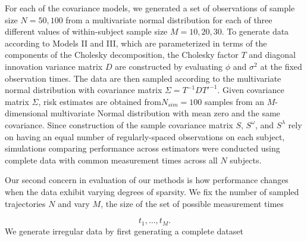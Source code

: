 %

For each of the covariance models, we generated a set of observations of sample size $N = 50, 100$ from a multivariate normal distribution for each of three different values of within-subject sample size $M = 10, 20, 30$. To generate data according to Models II and III, which are parameterized in terms of the components of the Cholesky decomposition, the Cholesky factor $T$ and diagonal innovation variance matrix $D$ are constructed by evaluating $\phi$ and $\sigma^2$ at the fixed observation times. The data are then sampled according to the multivariate normal distribution with covariance matrix $\Sigma = T^{-1} D {T'}^{-1}$. Given covariance matrix $\Sigma$, risk estimates are obtained from$N_{sim} = 100$ samples from an $M$-dimensional multivariate Normal distribution with mean zero and the same covariance.  Since construction of the sample covariance matrix $S$, $S^\omega$, and $S^\lambda$ rely on having an equal number of regularly-spaced observations on each subject, simulations comparing performance across estimators were conducted using complete data with common measurement times across all $N$ subjects. 

\bigskip

Our second concern in evaluation of our methods is how performance changes when the data exhibit varying degrees of sparsity. We fix the number of sampled trajectories $N$ and vary $M$, the size of the set  of possible measurement times

\[
t_1,\dots, t_M.
\]
\noindent
We generate irregular data by first generating a complete dataset 

